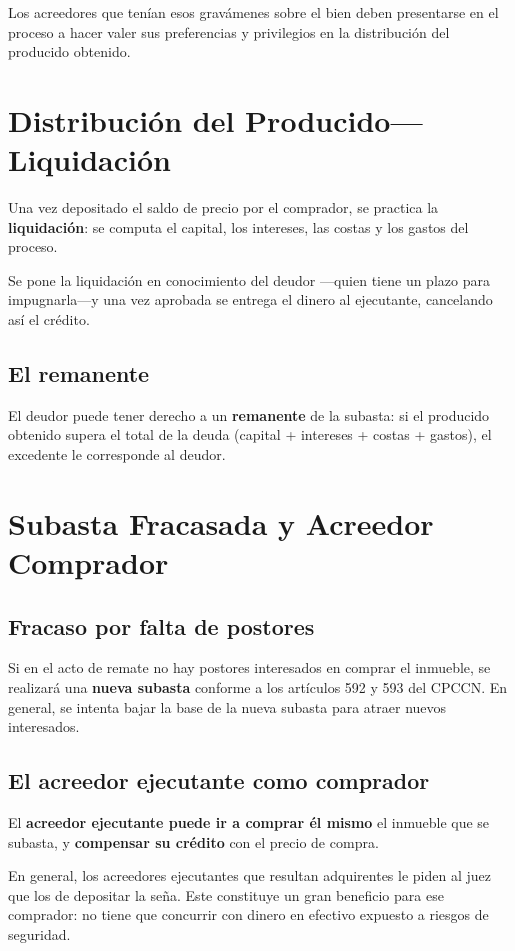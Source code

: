 \documentclass[12pt,oneside]{book}
\begin{document}
Los acreedores que tenían esos gravámenes sobre el bien deben presentarse en el proceso a hacer valer sus preferencias y privilegios en la distribución del producido obtenido.

\section{Distribución del Producido---Liquidación}

Una vez depositado el saldo de precio por el comprador, se practica la \textbf{liquidación}: se computa el capital, los intereses, las costas y los gastos del proceso.

Se pone la liquidación en conocimiento del deudor ---quien tiene un plazo para impugnarla---y una vez aprobada se entrega el dinero al ejecutante, cancelando así el crédito.

\subsection{El remanente}

El deudor puede tener derecho a un \textbf{remanente} de la subasta: si el producido obtenido supera el total de la deuda (capital + intereses + costas + gastos), el excedente le corresponde al deudor.

\section{Subasta Fracasada y Acreedor Comprador}

\subsection{Fracaso por falta de postores}

Si en el acto de remate no hay postores interesados en comprar el inmueble, se realizará una \textbf{nueva subasta} conforme a los artículos 592 y 593 del CPCCN. En general, se intenta bajar la base de la nueva subasta para atraer nuevos interesados.

\subsection{El acreedor ejecutante como comprador}

El \textbf{acreedor ejecutante puede ir a comprar él mismo} el inmueble que se subasta, y \textbf{compensar su crédito} con el precio de compra.

En general, los acreedores ejecutantes que resultan adquirentes le piden al juez que los \textima de depositar la seña. Este constituye un gran beneficio para ese comprador: no tiene que concurrir con dinero en efectivo expuesto a riesgos de seguridad.
\end{document}

